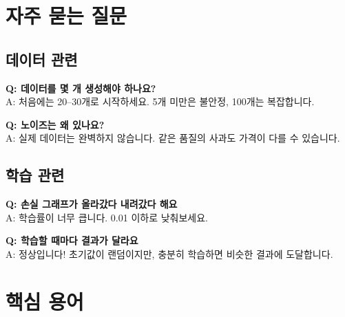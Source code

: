 \documentclass[11pt, a4paper]{article}
\begin{document}
\section{ 자주 묻는 질문}

\subsection{데이터 관련}

\textbf{Q: 데이터를 몇 개 생성해야 하나요?}\\
A: 처음에는 20--30개로 시작하세요. 5개 미만은 불안정, 100개는 복잡합니다.

\vspace{0.3cm}

\textbf{Q: 노이즈는 왜 있나요?}\\
A: 실제 데이터는 완벽하지 않습니다. 같은 품질의 사과도 가격이 다를 수 있습니다.

\subsection{학습 관련}

\textbf{Q: 손실 그래프가 올라갔다 내려갔다 해요}\\
A: 학습률이 너무 큽니다. 0.01 이하로 낮춰보세요.

\vspace{0.3cm}

\textbf{Q: 학습할 때마다 결과가 달라요}\\
A: 정상입니다! 초기값이 랜덤이지만, 충분히 학습하면 비슷한 결과에 도달합니다.

\section{ 핵심 용어}
\end{document}
